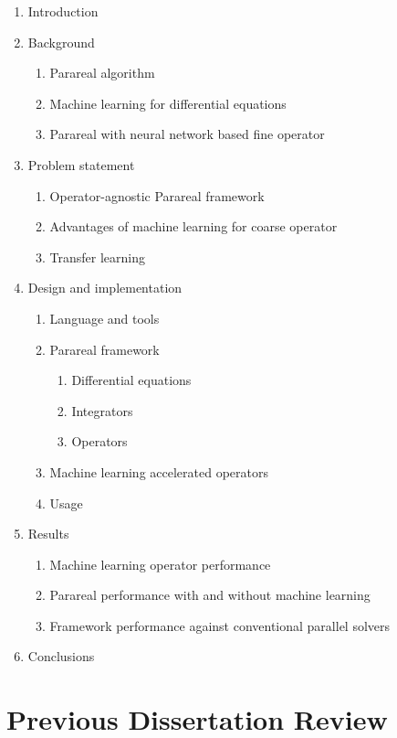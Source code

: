 \documentclass{article}
\begin{document}
\begin{enumerate}
	\item Introduction
	\item Background
    	\begin{enumerate}
    		\item Parareal algorithm
    		\item Machine learning for differential equations
    		\item Parareal with neural network based fine operator
    	\end{enumerate}
	\item Problem statement
    	\begin{enumerate}
    		\item Operator-agnostic Parareal framework
    		\item Advantages of machine learning for coarse operator
    		\item Transfer learning
    	\end{enumerate}
	\item Design and implementation
    	\begin{enumerate}
    	    \item Language and tools
    		\item Parareal framework
            	\begin{enumerate}
            		\item Differential equations
            		\item Integrators
            		\item Operators
            	\end{enumerate}
    		\item Machine learning accelerated operators
    		\item Usage
    	\end{enumerate}
    \item Results
        \begin{enumerate}
    		\item Machine learning operator performance
    		\item Parareal performance with and without machine learning
    		\item Framework performance against conventional parallel solvers
    	\end{enumerate}
	\item Conclusions
\end{enumerate}

\section{Previous Dissertation Review}
\end{document}
